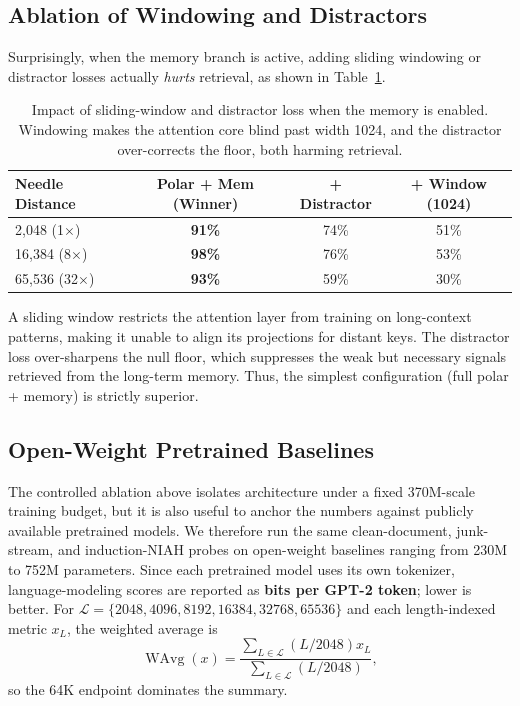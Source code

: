 \documentclass{article} %
\begin{document}
\subsection{Ablation of Windowing and Distractors}
\label{sec:window_distractor_ablation}
Surprisingly, when the memory branch is active, adding sliding windowing or distractor losses actually \textit{hurts} retrieval, as shown in Table~\ref{table:window_ablation}.

\begin{table}[h]
\centering
\begin{tabular}{lccc}
\toprule
\textbf{Needle Distance} & \textbf{Polar + Mem (Winner)} & \textbf{+ Distractor} & \textbf{+ Window (1024)} \\
\midrule
2,048 (1$\times$)  & \textbf{91\%} & 74\% & 51\% \\
16,384 (8$\times$) & \textbf{98\%} & 76\% & 53\% \\
65,536 (32$\times$)& \textbf{93\%} & 59\% & 30\% \\
\bottomrule
\end{tabular}
\caption{Impact of sliding-window and distractor loss when the memory is enabled. Windowing makes the attention core blind past width 1024, and the distractor over-corrects the floor, both harming retrieval.}
\label{table:window_ablation}
\end{table}

A sliding window restricts the attention layer from training on long-context patterns, making it unable to align its projections for distant keys. The distractor loss over-sharpens the null floor, which suppresses the weak but necessary signals retrieved from the long-term memory. Thus, the simplest configuration (full polar + memory) is strictly superior.

\subsection{Open-Weight Pretrained Baselines}
The controlled ablation above isolates architecture under a fixed 370M-scale training budget, but it is also useful to anchor the numbers against publicly available pretrained models. We therefore run the same clean-document, junk-stream, and induction-NIAH probes on open-weight baselines ranging from 230M to 752M parameters. Since each pretrained model uses its own tokenizer, language-modeling scores are reported as \textbf{bits per GPT-2 token}; lower is better. For $\mathcal{L}=\{2048,4096,8192,16384,32768,65536\}$ and each length-indexed metric $x_L$, the weighted average is
\begin{equation}
    \operatorname{WAvg}(x) = \frac{\sum_{L \in \mathcal{L}} (L / 2048) x_L}{\sum_{L \in \mathcal{L}} (L / 2048)},
\end{equation}
so the 64K endpoint dominates the summary.
\end{document}
